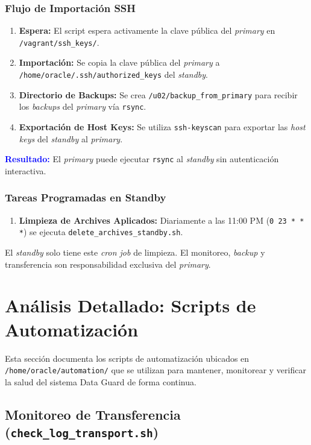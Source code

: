 \documentclass[11pt, a4paper]{report}
\newcommand{\destacado}[1]{\textbf{\textcolor{blue}{#1}}}
\begin{document}
\subsection{Flujo de Importación SSH}
\begin{enumerate}
    \item \textbf{Espera:} El script espera activamente la clave pública del \textit{primary} en \texttt{/vagrant/ssh\_keys/}.
\item \textbf{Importación:} Se copia la clave pública del \textit{primary} a \texttt{/home/oracle/.ssh/authorized\_keys} del \textit{standby}.
\item \textbf{Directorio de Backups:} Se crea \texttt{/u02/backup\_from\_primary} para recibir los \textit{backups} del \textit{primary} vía \texttt{rsync}.
\item \textbf{Exportación de Host Keys:} Se utiliza \texttt{ssh-keyscan} para exportar las \textit{host keys} del \textit{standby} al \textit{primary}.
\end{enumerate}
\destacado{Resultado:} El \textit{primary} puede ejecutar \texttt{rsync} al \textit{standby} sin autenticación interactiva.
\subsection{Tareas Programadas en Standby}
\begin{enumerate}
    \item \textbf{Limpieza de Archives Aplicados:} Diariamente a las 11:00 PM (\texttt{0 23 * * *}) se ejecuta \texttt{delete\_archives\_standby.sh}.
\end{enumerate}
El \textit{standby} solo tiene este \textit{cron job} de limpieza. El monitoreo, \textit{backup} y transferencia son responsabilidad exclusiva del \textit{primary}.

\newpage

\chapter[Apéndice C: Scripts Automatización]{Análisis Detallado: Scripts de Automatización}

Esta sección documenta los scripts de automatización ubicados en \texttt{/home/oracle/automation/} que se utilizan para mantener, monitorear y verificar la salud del sistema Data Guard de forma continua.
\section{Monitoreo de Transferencia (\texttt{check\_log\_transport.sh})}
\end{document}
